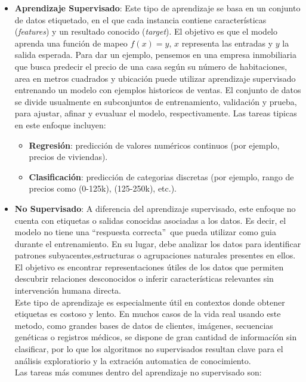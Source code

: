 \documentclass[11pt]{article} %
\begin{document}
\begin{itemize}
    \item \textbf{Aprendizaje Supervisado}: Este tipo de aprendizaje se basa en un conjunto de datos etiquetado, en el que cada instancia contiene características (\textit{features}) y un resultado conocido (\textit{target}). El objetivo es que el modelo aprenda una función de mapeo $f(x) = y$, $x$ representa las entradas y $y$ la salida esperada. Para dar un ejemplo, pensemos en una empresa inmobiliaria que busca predecir el precio de una casa según su número de habitaciones, area en metros cuadrados y ubicación puede utilizar aprendizaje supervisado entrenando un modelo con ejemplos historicos de ventas. El conjunto de datos se divide usualmente en subconjuntos de entrenamiento, validación y prueba, para ajustar, afinar y evualuar el modelo, respectivamente. Las tareas tipicas en este enfoque incluyen:
    \begin{itemize}
    \item\textbf{Regresión}: predicción de valores numéricos continuos (por ejemplo, precios de viviendas).
    \item\textbf{Clasificación}: predicción de categorias discretas (por ejemplo, rango de precios como (0-125k), (125-250k), etc.).    
    \end{itemize}
    \item \textbf{No Supervisado}: A diferencia del aprendizaje supervisado, este enfoque no cuenta con etiquetas o salidas conocidas asociadas a los datos. Es decir, el modelo no tiene una \textquotedblleft respuesta correcta\textquotedblright~que pueda utilizar como guia durante el entrenamiento. En su lugar, debe analizar los datos para identificar patrones subyacentes,estructuras o agrupaciones naturales presentes en ellos. El objetivo es encontrar representaciones útiles de los datos que permiten descubrir relaciones desconocidos o inferir características relevantes sin intervención humana directa. \\[2pt]
    Este tipo de aprendizaje es especialmente útil en contextos donde obtener etiquetas es costoso y lento. En muchos casos de la vida real usando este metodo, como grandes bases de datos de clientes, imágenes, secuencias genéticas o registros médicos, se dispone de gran cantidad de informacíón sin clasificar, por lo que los algoritmos no supervisados resultan clave para el análisis exploratiorio y la extración automatica de conocimiento. \\[2pt]
    Las tareas más comunes dentro del aprendizaje no supervisado son:

\end{itemize}
\end{document}

